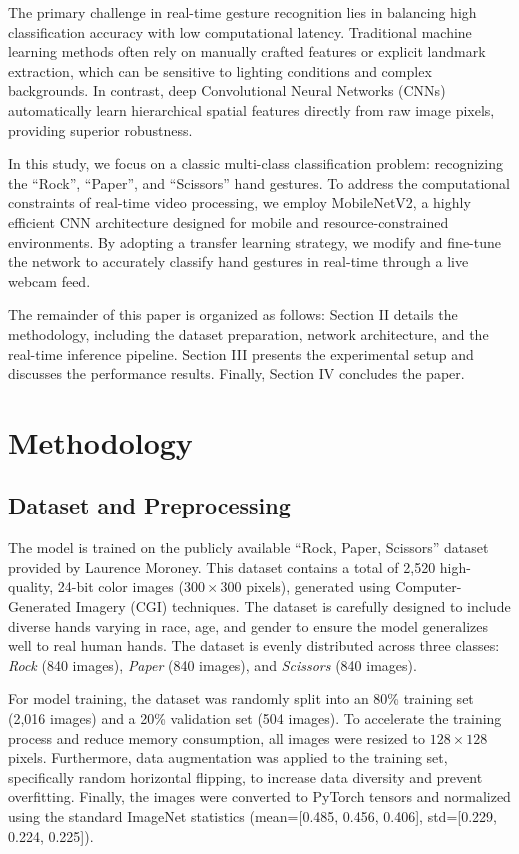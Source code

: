 \documentclass[conference]{IEEEtran}
\begin{document}
The primary challenge in real-time gesture recognition lies in balancing high classification accuracy with low computational latency. Traditional machine learning methods often rely on manually crafted features or explicit landmark extraction, which can be sensitive to lighting conditions and complex backgrounds. In contrast, deep Convolutional Neural Networks (CNNs) automatically learn hierarchical spatial features directly from raw image pixels, providing superior robustness.

In this study, we focus on a classic multi-class classification problem: recognizing the ``Rock'', ``Paper'', and ``Scissors'' hand gestures. To address the computational constraints of real-time video processing, we employ MobileNetV2, a highly efficient CNN architecture designed for mobile and resource-constrained environments. By adopting a transfer learning strategy, we modify and fine-tune the network to accurately classify hand gestures in real-time through a live webcam feed. 

The remainder of this paper is organized as follows: Section II details the methodology, including the dataset preparation, network architecture, and the real-time inference pipeline. Section III presents the experimental setup and discusses the performance results. Finally, Section IV concludes the paper.

\section{Methodology}

\subsection{Dataset and Preprocessing}
The model is trained on the publicly available ``Rock, Paper, Scissors'' dataset provided by Laurence Moroney. This dataset contains a total of 2,520 high-quality, 24-bit color images ($300 \times 300$ pixels), generated using Computer-Generated Imagery (CGI) techniques. The dataset is carefully designed to include diverse hands varying in race, age, and gender to ensure the model generalizes well to real human hands. The dataset is evenly distributed across three classes: \textit{Rock} (840 images), \textit{Paper} (840 images), and \textit{Scissors} (840 images).

For model training, the dataset was randomly split into an 80\% training set (2,016 images) and a 20\% validation set (504 images). To accelerate the training process and reduce memory consumption, all images were resized to $128 \times 128$ pixels. Furthermore, data augmentation was applied to the training set, specifically random horizontal flipping, to increase data diversity and prevent overfitting. Finally, the images were converted to PyTorch tensors and normalized using the standard ImageNet statistics (mean=[0.485, 0.456, 0.406], std=[0.229, 0.224, 0.225]).
\end{document}
